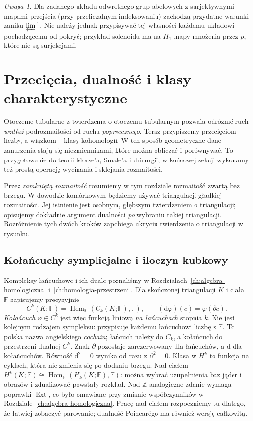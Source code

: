 \documentclass[11pt,a4paper,oneside]{report}
\newcommand{\Z}{\mathbb{Z}}
\newcommand{\dd}{\mathrm d}
\theoremstyle{plain}
\theoremstyle{definition}
\theoremstyle{remark}
\newtheorem{uwaga}[twierdzenie]{Uwaga}
\begin{document}
\begin{uwaga}
Dla zadanego układu odwrotnego grup abelowych z
surjektywnymi mapami przejścia (przy przeliczalnym
indeksowaniu) zachodzą przydatne warunki zaniku
$\varprojlim{}^1$. Nie należy jednak przypisywać tej
własności każdemu układowi pochodzącemu od pokryć;
przykład solenoidu ma na $H_1$ mapy mnożenia przez $p$,
które nie są surjekcjami.
\end{uwaga}
\clearpage

\chapter{Przecięcia, dualność i klasy charakterystyczne}
\label{ch:przeciecia-dualnosc-klasy}

Otoczenie tubularne z twierdzenia o otoczeniu tubularnym
pozwala odróżnić ruch \emph{wzdłuż} podrozmaitości
od ruchu \emph{poprzecznego}. Teraz przypiszemy
przecięciom liczby, a wiązkom -- klasy kohomologii.
W ten sposób geometryczne dane zanurzenia stają się
niezmiennikami, które można obliczać i porównywać.
To przygotowanie do teorii Morse'a, Smale'a i chirurgii;
w końcowej sekcji wykonamy też prostą operację
wycinania i sklejania rozmaitości.

Przez \emph{zamkniętą rozmaitość} rozumiemy w tym
rozdziale rozmaitość zwartą bez brzegu. W dowodzie
komórkowym będziemy używać triangulacji gładkiej
rozmaitości. Jej istnienie jest osobnym, głębszym
twierdzeniem o triangulacji; opisujemy dokładnie
argument dualności \emph{po} wybraniu takiej
triangulacji. Rozróżnienie tych dwóch kroków
zapobiega ukryciu twierdzenia o triangulacji
w rysunku.

\section{Kołańcuchy symplicjalne i iloczyn kubkowy}
\label{sec:kubek-16}

Kompleksy łańcuchowe i ich duale poznaliśmy
w Rozdziałach~\ref{ch:algebra-homologiczna}
i~\ref{ch:homologia-przestrzeni}. Dla
skończonej triangulacji $K$ i ciała $\mathbb F$
zapisujemy precyzyjnie
\[
 C^k(K;\mathbb F)
   =\operatorname{Hom}_{\mathbb F}
       (C_k(K;\mathbb F),\mathbb F),
 \qquad
 (\dd\varphi)(c)=\varphi(\partial c).
\]
\emph{Kołańcuch} $\varphi\in C^k$ jest więc
funkcją liniową \emph{na łańcuchach} stopnia $k$.
Nie jest kolejnym rodzajem sympleksu:
przypisuje każdemu łańcuchowi liczbę z
$\mathbb F$. To polska nazwa angielskiego
\emph{cochain}; łańcuch należy do $C_k$,
a kołańcuch do przestrzeni dualnej $C^k$.
Znak $\partial$ pozostaje zarezerwowany
dla łańcuchów, a $\dd$ dla kołańcuchów.
Równość $\dd^2=0$ wynika od razu z
$\partial^2=0$. Klasa w $H^k$ to
funkcja na cyklach, która nie zmienia
się po dodaniu brzegu. Nad ciałem
$H^k(K;\mathbb F)\cong
\operatorname{Hom}_{\mathbb F}(H_k(K;\mathbb F),\mathbb F)$:
można wybrać uzupełnienia baz jąder
i obrazów i zdualizować powstały
rozkład. Nad $\Z$ analogiczne zdanie
wymaga poprawki $\operatorname{Ext}$,
co było omawiane przy zmianie
współczynników w Rozdziale~\ref{ch:algebra-homologiczna}.
Pracę nad ciałem rozpoczniemy tu dlatego,
że łatwiej zobaczyć parowanie;
dualność Poincarégo ma również
wersję całkowitą.
\end{document}
